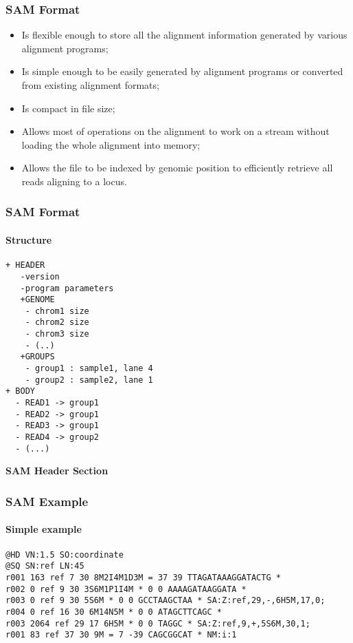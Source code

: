 \documentclass{beamer}
\newcommand{\centeredtitle}[1]{
\begin{center}
    \Huge{\bf{#1}}
\end{center}
}
\newcommand{\hugeslide}[1]{
\begin{frame}
\centeredtitle{#1}
\end{frame}
}
\begin{document}
\begin{frame}[fragile]
\frametitle{SAM Format}
\begin{itemize}
\item Is flexible enough to store all the alignment information generated by various alignment programs;
\item Is simple enough to be easily generated by alignment programs or converted from existing alignment formats;
\item Is compact in file size;
\item Allows most of operations on the alignment to work on a stream without loading the whole alignment into memory;
\item Allows the file to be indexed by genomic position to efficiently retrieve all reads aligning to a locus. 
\end{itemize}
\end{frame}





\begin{frame}[fragile]
\frametitle{SAM Format}
\framesubtitle{Structure}
\begin{verbatim}
+ HEADER
   -version
   -program parameters
   +GENOME
   	- chrom1 size
   	- chrom2 size
   	- chrom3 size
   	- (..)
   +GROUPS
   	- group1 : sample1, lane 4
   	- group2 : sample2, lane 1
+ BODY
  - READ1 -> group1
  - READ2 -> group1
  - READ3 -> group1
  - READ4 -> group2
  - (...)
\end{verbatim}

\end{frame}

\hugeslide{SAM Header Section}

\begin{frame}[fragile]
\frametitle{SAM Example}
\framesubtitle{Simple example}
\begin{framed}\tiny
\begin{verbatim}
@HD VN:1.5 SO:coordinate
@SQ SN:ref LN:45
r001 163 ref 7 30 8M2I4M1D3M = 37 39 TTAGATAAAGGATACTG *
r002 0 ref 9 30 3S6M1P1I4M * 0 0 AAAAGATAAGGATA *
r003 0 ref 9 30 5S6M * 0 0 GCCTAAGCTAA * SA:Z:ref,29,-,6H5M,17,0;
r004 0 ref 16 30 6M14N5M * 0 0 ATAGCTTCAGC *
r003 2064 ref 29 17 6H5M * 0 0 TAGGC * SA:Z:ref,9,+,5S6M,30,1;
r001 83 ref 37 30 9M = 7 -39 CAGCGGCAT * NM:i:1
\end{verbatim}
\end{framed}
\end{frame}
\end{document}
